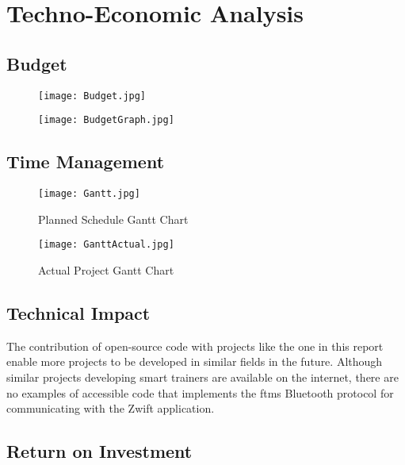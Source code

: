 \newpage

\chapter{Techno-Economic Analysis}

\section{Budget}

\begin{figure}[H]
	\centering
	\texttt{[image: Budget.jpg]}
	\label{fig:budget}
\end{figure}

\begin{figure}[H]
	\centering
	\texttt{[image: BudgetGraph.jpg]}
	\label{fig:budgetgraph}
\end{figure}

\section{Time Management}

\begin{figure}[H]
	\centering
	\texttt{[image: Gantt.jpg]}
	\caption{Planned Schedule Gantt Chart}
	\label{fig:gantt}
\end{figure}

\begin{figure}[H]
	\centering
	\texttt{[image: GanttActual.jpg]}
	\caption{Actual Project Gantt Chart}
	\label{fig:ganttact}
\end{figure}

\section{Technical Impact}

The contribution of open-source code with projects like the one in this report enable more projects to be developed in similar fields in the future. Although similar projects developing smart trainers are available on the internet, there are no examples of accessible code that implements the \ac{ftms} Bluetooth protocol for communicating with the Zwift application.

\section{Return on Investment}

